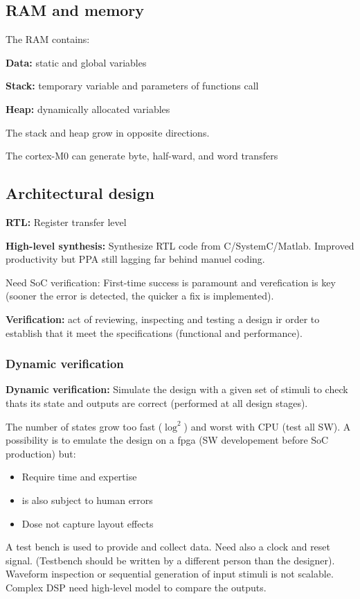 \subsection{RAM and memory}
The RAM contains:

\textbf{Data:} static and global variables

\textbf{Stack:} temporary variable and parameters of functions call

\textbf{Heap:} dynamically allocated variables

The stack and heap grow in opposite directions.

The cortex-M0 can generate byte, half-ward, and word transfers

\subsection{Architectural design}

\textbf{RTL:} Register transfer level

\textbf{High-level synthesis:} Synthesize RTL code from C/SystemC/Matlab. Improved productivity but PPA still lagging far behind manuel coding.
\bigbreak

Need SoC verification: First-time success is paramount and verefication is key (sooner the error is detected, the quicker a fix is implemented).

\textbf{Verification:} act of reviewing, inspecting and testing a design ir order to establish that it meet the specifications (functional and performance).

\subsubsection{Dynamic verification}
\textbf{Dynamic verification:} Simulate the design with a given set of stimuli to check thats its state and outputs are correct (performed at all design stages).

The number of states grow too fast (\(\log^2\)) and worst with CPU (test all SW). A possibility is to emulate the design on a fpga (SW developement before SoC production) but:
\begin{itemize}
  \item Require time and expertise
  \item is also subject to human errors
  \item Dose not capture layout effects
\end{itemize}

A test bench is used to provide and collect data. Need also a clock and reset signal. (Testbench should be written by a different person than the designer). Waveform inspection or sequential generation of input stimuli is not scalable. Complex DSP need high-level model to compare the outputs.


